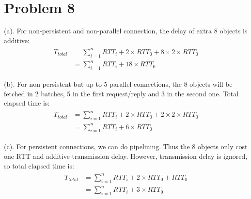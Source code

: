 \documentclass[titlepage, paper=a4, fontsize=11pt]{scrartcl} %
\numberwithin{equation}{section} %
\numberwithin{figure}{section} %
\numberwithin{table}{section} %
\begin{document}

\section*{Problem 8}
(a). For non-persistent and non-parallel connection, the delay of extra 8 objects is additive:
\begin{align*} 
\begin{split}
T_{total} &= \sum\limits_{i=1}^n RTT_{i} + 2 \times RTT_{0} + 8 \times 2 \times RTT_{0} \\
&= \sum\limits_{i=1}^n RTT_{i} + 18 \times RTT_{0}
\end{split}					
\end{align*}

(b). For non-persistent but up to 5 parallel connections, the 8 objects will be fetched in 2 batches,
5 in the first request/reply and 3 in the second one. Total elapsed time is:
\begin{align*} 
\begin{split}
T_{total} &= \sum\limits_{i=1}^n RTT_{i} + 2 \times RTT_{0} + 2 \times 2 \times RTT_{0} \\
&= \sum\limits_{i=1}^n RTT_{i} + 6 \times RTT_{0}
\end{split}					
\end{align*}

(c). For persistent connections, we can do pipelining. Thus the 8 objects only cost one RTT and additive
transmission delay. However, transmission delay is ignored, so total elapsed time is:
\begin{align*} 
\begin{split}
T_{total} &= \sum\limits_{i=1}^n RTT_{i} + 2 \times RTT_{0} + RTT_{0} \\
&= \sum\limits_{i=1}^n RTT_{i} + 3 \times RTT_{0}
\end{split}					
\end{align*}
\\


\end{document}

